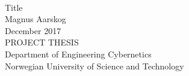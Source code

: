 \documentclass[10pt,b5paper,twoside,openright]{book}
\begin{document}
\pagestyle{plain}

\thispagestyle{empty}
\mbox{}\\[6pc]
\begin{center}
\Huge{Title}\\[2pc]

\Large{Magnus Aarskog}\\[1pc]
\large{December 2017}\\[2pc]

PROJECT THESIS\\
Department of Engineering Cybernetics\\
Norwegian University of Science and Technology
\end{center}
\vfill


\frontmatter
\pagestyle{plain}
\begingroup
\let\cleardoublepage\clearpage



\tableofcontents \clearpage
\listoftables    \clearpage
\listoffigures   \clearpage
\endgroup



\mainmatter
\pagestyle{headings}






%
%
%
%


\backmatter
{}

\end{document}
